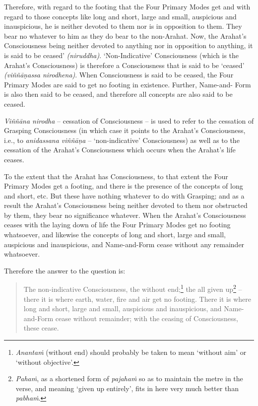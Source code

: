Therefore, with regard to the footing that the Four Primary Modes get and with regard to those concepts like long and short, large and small, auspicious and inauspicious, he is neither devoted to them nor is in opposition to them. They bear no  whatever to him as they do bear to the non-Arahat. Now, the Arahat's Consciousness being neither devoted to anything nor in opposition to anything, it is said to be ceased' \emph{(niruddha)}. `Non-Indicative' Consciousness (which is the Arahat's Consciousness) is therefore a Consciousness that is said to be `ceased' \emph{(viññāṇassa nirodhena)}. When Consciousness is said to be ceased, the Four Primary Modes are said to get no footing in existence. Further, Name-and- Form is also then said to be ceased, and therefore all concepts are also said to be ceased.

\emph{Viññāna nirodha} -- cessation of Consciousness -- is used to refer to the cessation of Grasping Consciousness (in which case it points to the Arahat's Consciousness, i.e., to \emph{anidassana viññāṇa} -- `non-indicative' Consciousness) as well as to the cessation of the Arahat's Consciousness which occurs when the Arahat's life ceases.

To the extent that the Arahat has Consciousness, to that extent the Four Primary Modes get a footing, and there is the presence of the concepts of long and short, etc. But these have nothing whatever to do with Grasping; and as a result the Arahat's Consciousness being neither devoted to them nor obstructed by them, they bear no significance whatever. When the Arahat's Consciousness ceases with the laying down of life the Four Primary Modes get no footing whatsoever, and likewise the concepts of long and short, large and small, auspicious and inauspicious, and Name-and-Form cease without any remainder whatsoever.

\clearpage

Therefore the answer to the question is:

\begin{quote}
The non-indicative Consciousness, the without end;\footnote{\emph{Anantaṁ} (without end) should probably be taken to mean `without aim' or `without objective'.} the all given up\footnote{\emph{Pahaṁ}, as a shortened form of \emph{pajahaṁ} so as to maintain the metre in the verse, and meaning `given up entirely', fits in here very much better than \emph{pabhaṁ}.} -- there it is where earth, water, fire and air get no footing. There it is where long and short, large and small, auspicious and inauspicious, and Name-and-Form cease without remainder; with the ceasing of Consciousness, these cease.
\end{quote}

